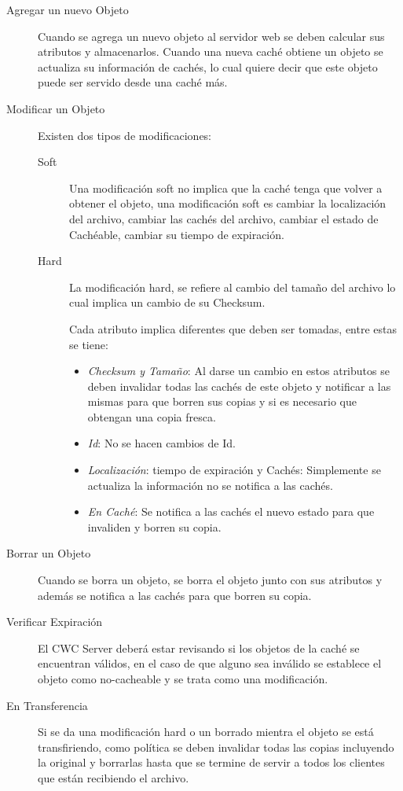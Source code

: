 \begin{description}

\item[Agregar un nuevo Objeto] Cuando se agrega un nuevo objeto al servidor web se deben calcular sus atributos y almacenarlos. Cuando una nueva caché obtiene un objeto se actualiza su información de cachés, lo cual quiere decir que este objeto puede ser servido desde una caché más.

\item [Modificar un Objeto] Existen dos tipos de modificaciones: 
	\begin{description}
	\item[Soft] Una modificación soft no implica que la caché tenga que volver a obtener el objeto, una modificación soft es cambiar la localización del archivo, cambiar las cachés del archivo, cambiar el estado de Cachéable, cambiar su tiempo de expiración.
	\item [Hard] La modificación hard, se refiere al cambio del tamaño del archivo lo cual implica un cambio de su Checksum.

Cada atributo implica diferentes que deben ser tomadas, entre estas se tiene:

		\begin{itemize}
		\item \textit{Checksum y Tamaño}: Al darse un cambio en estos atributos se deben invalidar todas las cachés de este objeto y notificar a las mismas para que borren sus copias y si es necesario que obtengan una copia fresca.
		\item \textit{Id}: No se hacen cambios de Id.
		\item \textit{Localización}: tiempo de expiración y Cachés: Simplemente se actualiza la información no se notifica a las cachés.
		\item \textit{En Caché}: Se notifica a las cachés el nuevo estado para que invaliden y borren su copia.
		\end{itemize}

\end{description}

\item [Borrar un Objeto] Cuando se borra un objeto, se borra el objeto junto con sus atributos y además se notifica a las cachés para que borren su copia.

\item [Verificar Expiración] El CWC Server deberá estar revisando si los objetos de la caché se encuentran válidos, en el caso de que alguno sea inválido se establece el objeto como no-cacheable y se trata como una modificación. 

\item [En Transferencia] Si se da una modificación hard o un borrado mientra el objeto se está transfiriendo, como política se deben invalidar todas las copias incluyendo la original y borrarlas hasta que se termine de servir a todos los clientes que están recibiendo el archivo.

\end{description}

